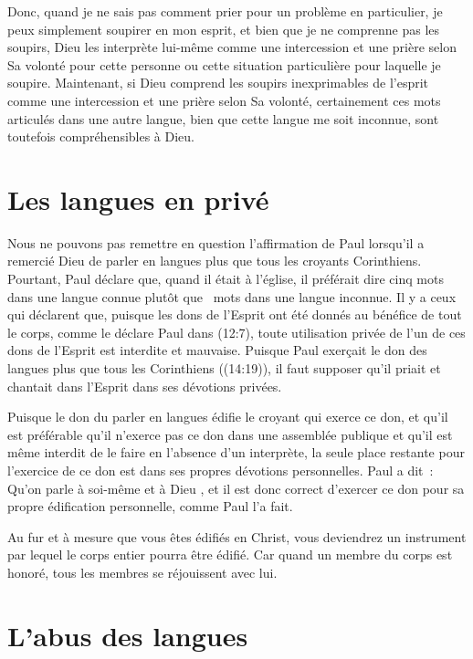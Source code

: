 Donc, quand je ne sais pas comment prier pour un problème en particulier,
 je peux simplement soupirer en mon esprit, et bien que je ne comprenne pas
 les soupirs, Dieu les interprète lui-même comme une intercession
 et une prière selon Sa volonté pour cette personne ou cette situation
 particulière pour laquelle je soupire. Maintenant, si Dieu comprend
 les soupirs inexprimables de l'esprit comme une intercession
 et une prière selon Sa volonté, certainement ces mots articulés
 dans une autre langue, bien que cette langue me soit inconnue,
 sont toutefois compréhensibles à Dieu.


\section{Les langues en priv\'e}

\begin{specialpar}{}
Nous ne pouvons pas remettre en question l'affirmation de Paul lorsqu'il
 a remercié Dieu de parler en langues plus que tous les croyants Corinthiens.
 Pourtant, Paul déclare que, quand il était à l'église, il préférait dire
 cinq mots dans une langue connue plutôt que ~mots
 dans une langue inconnue. Il y a ceux qui déclarent que, puisque les dons
 de l'Esprit ont été donnés au bénéfice de tout le corps, comme le déclare
 Paul dans (12:7), toute utilisation privée
 de l'un de ces dons de l'Esprit est interdite et mauvaise.
 Puisque Paul exerçait le don des langues plus que tous les Corinthiens
 ((14:19)), il faut supposer qu'il priait et chantait
 dans l'Esprit dans ses dévotions privées.
\end{specialpar}

Puisque le don du parler en langues édifie le croyant qui exerce ce don,
 et qu'il est préférable qu'il n'exerce pas ce don dans une assemblée publique
 et qu'il est même interdit de le faire en l'absence d'un interprète,
 la seule place restante pour l'exercice de ce don est dans ses propres
 dévotions personnelles. Paul a dit~:
 \og Qu'on parle à soi-même et à Dieu \fg{}, et il est donc correct
 d'exercer ce don pour sa propre édification personnelle, comme Paul l'a fait.

Au fur et à mesure que vous êtes édifiés en Christ, vous deviendrez
 un instrument par lequel le corps entier pourra être édifié.
 Car quand un membre du corps est honoré, tous les membres
 se réjouissent avec lui.


\section{L'abus des langues}


